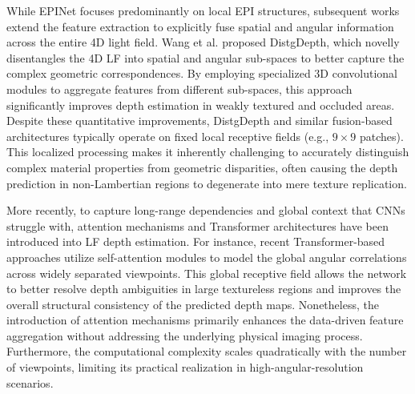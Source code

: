 \documentclass[journal]{IEEEtran}
\begin{document}
While EPINet focuses predominantly on local EPI structures, subsequent works extend the feature extraction to explicitly fuse spatial and angular information across the entire 4D light field. Wang et al.  proposed DistgDepth, which novelly disentangles the 4D LF into spatial and angular sub-spaces to better capture the complex geometric correspondences. By employing specialized 3D convolutional modules to aggregate features from different sub-spaces, this approach significantly improves depth estimation in weakly textured and occluded areas. Despite these quantitative improvements, DistgDepth and similar fusion-based architectures typically operate on fixed local receptive fields (e.g., \(9 \times 9\) patches). This localized processing makes it inherently challenging to accurately distinguish complex material properties from geometric disparities, often causing the depth prediction in non-Lambertian regions to degenerate into mere texture replication.

More recently, to capture long-range dependencies and global context that CNNs struggle with, attention mechanisms and Transformer architectures have been introduced into LF depth estimation. For instance, recent Transformer-based approaches  utilize self-attention modules to model the global angular correlations across widely separated viewpoints. This global receptive field allows the network to better resolve depth ambiguities in large textureless regions and improves the overall structural consistency of the predicted depth maps. Nonetheless, the introduction of attention mechanisms primarily enhances the data-driven feature aggregation without addressing the underlying physical imaging process. Furthermore, the computational complexity scales quadratically with the number of viewpoints, limiting its practical realization in high-angular-resolution scenarios.
\end{document}

